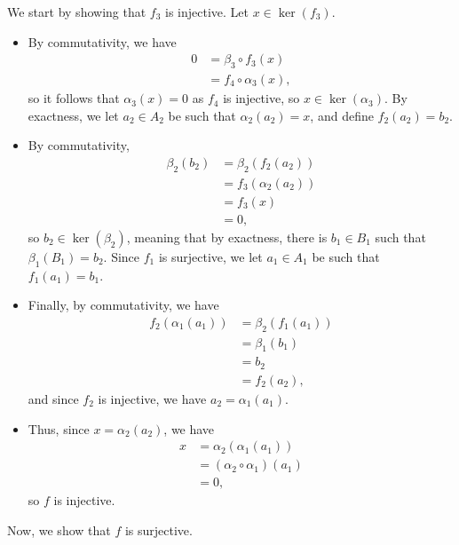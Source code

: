\documentclass[10pt]{mypackage}
\begin{document}
\begin{solution}
  We start by showing that $f_3$ is injective. Let $x\in \ker\left( f_3 \right)$.
  \begin{itemize}
    \item By commutativity, we have 
      \begin{align*}
        0 &= \beta_3\circ f_3(x)\\
                            &= f_4\circ \alpha_3(x),
      \end{align*}
    so it follows that $\alpha_3(x) = 0$ as $f_4$ is injective, so $x\in \ker\left( \alpha_3 \right)$. By exactness, we let $a_2\in A_2$ be such that $\alpha_2\left(a_2\right) = x$, and define $f_2\left( a_2 \right) = b_2$.
    \item By commutativity, 
      \begin{align*}
        \beta_2\left( b_2 \right) &= \beta_2\left( f_2\left( a_2 \right) \right)\\
                                  &= f_3\left( \alpha_2\left( a_2 \right) \right)\\
                                  &= f_3\left( x \right)\\
                                  &= 0,
      \end{align*}
      so $b_2\in\ker\left( \beta_2 \right)$, meaning that by exactness, there is $b_1 \in B_1$ such that $\beta_1\left( B_1 \right) = b_2$. Since $f_1$ is surjective, we let $a_1\in A_1$ be such that $f_1\left( a_1 \right) = b_1$.
    \item Finally, by commutativity, we have
      \begin{align*}
        f_2\left( \alpha_1\left( a_1 \right) \right) &= \beta_2\left( f_1\left( a_1 \right) \right)\\
                                                     &= \beta_1\left( b_1 \right)\\
                                                     &= b_2\\
                                                     &= f_2\left( a_2 \right),
      \end{align*}
      and since $f_2$ is injective, we have $a_2 = \alpha_1\left( a_1 \right)$.
    \item Thus, since $x = \alpha_2\left( a_2 \right)$, we have 
      \begin{align*}
        x &= \alpha_2\left( \alpha_1\left( a_1 \right) \right)\\
          &= \left( \alpha_2\circ \alpha_1 \right)\left( a_1 \right)\\
          &= 0,
      \end{align*}
      so $f$ is injective.
  \end{itemize}
  Now, we show that $f$ is surjective.
\end{solution}
\end{document}
